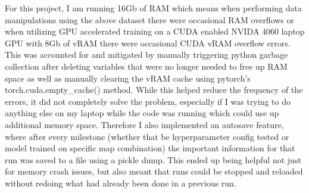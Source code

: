 \documentclass[11pt]{scrartcl}
\begin{document}
For this project, I am running 16Gb of RAM which means when performing data manipulations using the above dataset there were occasional RAM overflows or when utilizing GPU accelerated training on a CUDA enabled NVIDA 4060 laptop GPU with 8Gb of vRAM there were occasional CUDA vRAM overflow errors. This was accounted for and mitigated by manually triggering python garbage collection after deleting variables that were no longer needed to free up RAM space as well as manually clearing the vRAM cache using pytorch's torch.cuda.empty\_cache() method. While this helped reduce the frequency of the errors, it did not completely solve the problem, especially if I was trying to do anything else on my laptop while the code was running which could use up additional memory space. Therefore I also implemented an autosave feature, where after every milestone (whether that be hyperparameter config tested or model trained on specific map combination) the important information for that run was saved to a file using a pickle dump. This ended up being helpful not just for memory crash issues, but also meant that runs could be stopped and reloaded without redoing what had already been done in a previous run. 
\end{document}
